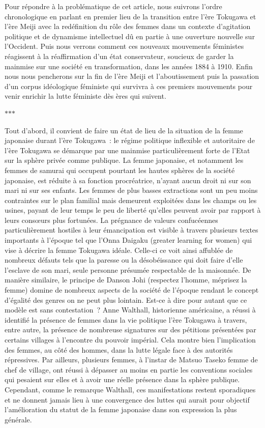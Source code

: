 \documentclass[11pt,a4paper]{article}
\newcommand{\partbreak}{\par\begin{center}\color{muted}$\ast$\quad$\ast$\quad$\ast$\end{center}\par}
\begin{document}
Pour répondre à la problématique de cet article, nous suivrons l’ordre chronologique en parlant en premier lieu de la transition entre l’ère Tokugawa et l’ère Meiji avec la redéfinition du rôle des femmes dans un contexte d’agitation politique et de dynamisme intellectuel dû en partie à une ouverture nouvelle sur l’Occident. Puis nous verrons comment ces nouveaux mouvements féministes réagissent à la réaffirmation d’un état conservateur, soucieux de garder la mainmise sur une société en transformation, dans les années 1884 à 1910. Enfin nous nous pencherons sur la fin de l’ère Meiji et l’aboutissement puis la passation d’un corpus idéologique féministe qui survivra à ces premiers mouvements pour venir enrichir la lutte féministe dès ères qui suivent.

\partbreak

Tout d’abord, il convient de faire un état de lieu de la situation de la femme japonaise durant l’ère Tokugawa~: le régime politique inflexible et autoritaire de l’ère Tokugawa se démarque par une mainmise particulièrement forte de l’Etat sur la sphère privée comme publique. La femme japonaise, et notamment les femmes de samurai qui occupent pourtant les hautes sphères de la société japonaise, est réduite à sa fonction procréatrice, n’ayant aucun droit ni sur son mari ni sur ses enfants. Les femmes de plus basses extractions sont un peu moins contraintes sur le plan familial mais demeurent exploitées dans les champs ou les usines, payant de leur temps le peu de liberté qu’elles peuvent avoir par rapport à leurs consœurs plus fortunées. La prégnance de valeurs confucéennes particulièrement hostiles à leur émancipation est visible à travers plusieurs textes importants à l’époque tel que l’Onna Daigaku (greater learning for women) qui vise à décrire la femme Tokugawa idéale. Celle-ci ce voit ainsi affublée de nombreux défauts tels que la paresse ou la désobéissance qui doit faire d’elle l’esclave de son mari, seule personne présumée respectable de la maisonnée. De manière similaire, le principe de Danson Johi (respectez l’homme, méprisez la femme) domine de nombreux aspects de la société de l’époque rendant le concept d’égalité des genres on ne peut plus lointain. Est-ce à dire pour autant que ce modèle est sans contestation~? Anne Walthall, historienne américaine, a réussi à identifié la présence de femmes dans la vie politique l’ère Tokugawa à travers, entre autre, la présence de nombreuse signatures sur des pétitions présentées par certains villages à l’encontre du pouvoir impérial. Cela montre bien l’implication des femmes, au côté des hommes, dans la lutte légale face à des autorités répressives. Par ailleurs, plusieurs femmes, à l’instar de Matsuo Taseko femme de chef de village, ont réussi à dépasser au moins en partie les conventions sociales qui pesaient sur elles et à avoir une réelle présence dans la sphère publique. Cependant, comme le remarque Walthall, ces manifestations restent sporadiques et ne donnent jamais lieu à une convergence des luttes qui aurait pour objectif l’amélioration du statut de la femme japonaise dans son expression la plus générale.
\end{document}
